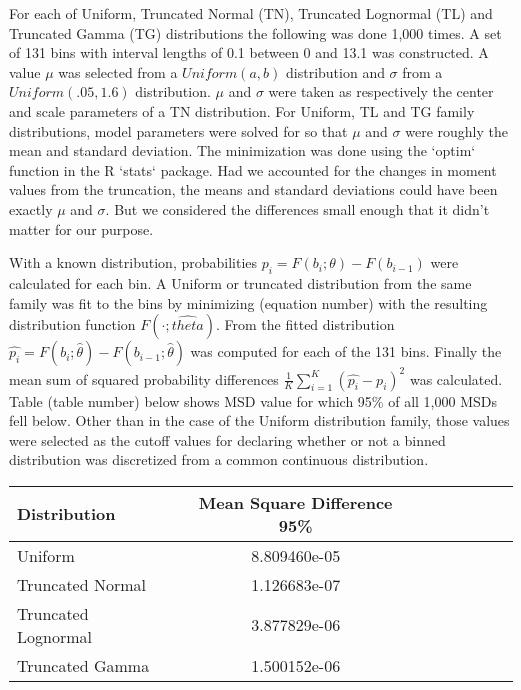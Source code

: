 \documentclass{article}\usepackage[]{graphicx}\usepackage[]{color}
\begin{document}
For each of Uniform, Truncated Normal (TN), Truncated Lognormal (TL) and 
Truncated Gamma (TG) distributions the following was
done 1,000 times. A set of 131 bins with interval lengths of 
0.1 between 0 and 13.1 was constructed. 
A value $\mu$ was selected from a $Uniform(a,b)$ distribution and $\sigma$ from 
a $Uniform(.05,1.6)$ distribution. $\mu$ and $\sigma$ were taken as respectively 
the center and scale parameters of a TN distribution. 
For Uniform, TL and TG family
distributions, model parameters were solved for so that $\mu$ and $\sigma$ 
were roughly the mean and standard deviation. The minimization was done using 
the `optim` function in the R `stats` package.
Had we accounted for the changes
in moment values from the truncation, the means and standard deviations could 
have been exactly $\mu$ and $\sigma$. But we considered the differences small 
enough that it didn't matter for our purpose.

With a known distribution, probabilities $p_i =F(b_i; \theta) - F(b_{i-1})$ were
calculated for each bin. A Uniform or truncated distribution from the same
family was fit to the bins by minimizing (equation number) with the resulting
distribution function $F(\cdot; \hat{theta})$. From the fitted distribution
$\hat{p_i} = F(b_i; \hat{\theta}) - F(b_{i-1}; \hat{\theta})$ was computed for 
each of the 131 bins. Finally the mean sum of squared probability differences
$\frac{1}{K}\sum_{i=1}^K (\hat{p_i} - p_i)^2$ was calculated. Table (table number)
below shows MSD value for which 95\% of all 1,000 MSDs fell below. Other than in
the case of the Uniform distribution family, those values were selected as the 
cutoff values for declaring whether or not a binned distribution was discretized
from a common continuous distribution.


\begin{table}[h!]
  \centering
  \begin{tabular}{l*{6}{c}r}
  Distribution          & Mean Square Difference 95\%  \\
  \hline
  Uniform               & 8.809460e-05   \\
  Truncated Normal      & 1.126683e-07  \\
  Truncated Lognormal   & 3.877829e-06  \\
  Truncated Gamma       & 1.500152e-06  \\
  \end{tabular}
\end{table}
\end{document}
